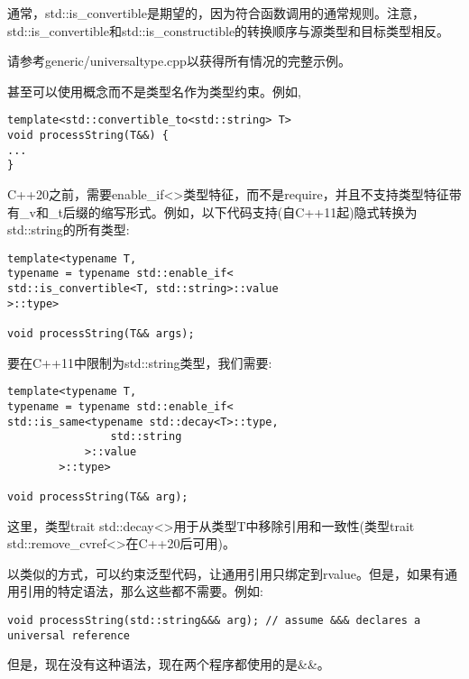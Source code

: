 通常，std::is\_convertible是期望的，因为符合函数调用的通常规则。注意，std::is\_convertible和std::is\_constructible的转换顺序与源类型和目标类型相反。\par

请参考generic/universaltype.cpp以获得所有情况的完整示例。\par

甚至可以使用概念而不是类型名作为类型约束。例如,
\begin{lstlisting}[caption={}]
template<std::convertible_to<std::string> T>
void processString(T&&) {
...
}
\end{lstlisting}

C++20之前，需要enable\_if<>类型特征，而不是require，并且不支持类型特征带有\_v和\_t后缀的缩写形式。例如，以下代码支持(自C++11起)隐式转换为std::string的所有类型:\par

\begin{lstlisting}[caption={}]
template<typename T,
typename = typename std::enable_if<
std::is_convertible<T, std::string>::value
>::type>

void processString(T&& args);
\end{lstlisting}

要在C++11中限制为std::string类型，我们需要:\par

\begin{lstlisting}[caption={}]
template<typename T,
typename = typename std::enable_if<
std::is_same<typename std::decay<T>::type,
				std::string
			>::value
		>::type>

void processString(T&& arg);
\end{lstlisting}

这里，类型trait std::decay<>用于从类型T中移除引用和一致性(类型trait std::remove\_cvref<>在C++20后可用)。\par

以类似的方式，可以约束泛型代码，让通用引用只绑定到rvalue。但是，如果有通用引用的特定语法，那么这些都不需要。例如:\par

\begin{lstlisting}[caption={}]
void processString(std::string&&& arg); // assume &&& declares a universal reference
\end{lstlisting}

但是，现在没有这种语法，现在两个程序都使用的是\&\&。\par




























